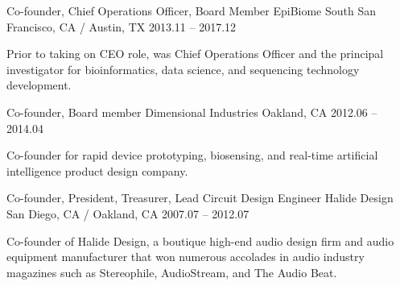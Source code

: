 \begin{cventries}
{\begin{cvitems}
      \end{cvitems}
    }
    \cventry
    {Co-founder, Chief Operations Officer, Board Member}
    {EpiBiome}
    {South San Francisco, CA / Austin, TX}
    {2013.11 -- 2017.12}
    {
      \begin{cvitems}
        Prior to taking on CEO role, was Chief Operations Officer and the principal investigator for bioinformatics, data science, and sequencing technology development.
      \end{cvitems}
    }
    \cventry
    {Co-founder, Board member}
    {Dimensional Industries}
    {Oakland, CA}
    {2012.06 -- 2014.04}
    {
      \begin{cvitems}
       Co-founder for rapid device prototyping, biosensing, and real-time artificial intelligence product design company.
      \end{cvitems}
    }
    \cventry
    {Co-founder, President, Treasurer, Lead Circuit Design Engineer}
    {Halide Design}
    {San Diego, CA / Oakland, CA}
    {2007.07 -- 2012.07}
    {
      \begin{cvitems}
        Co-founder of Halide Design, a boutique high-end audio design firm and audio equipment manufacturer that won numerous accolades in audio industry magazines such as Stereophile, AudioStream, and The Audio Beat.
      \end{cvitems}
    }
\end{cventries}
